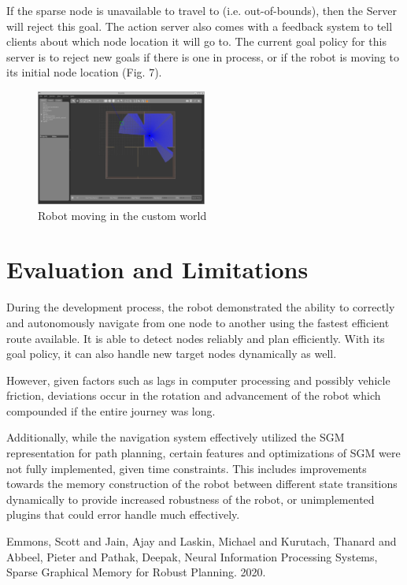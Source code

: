 \documentclass[conference]{IEEEtran}
\begin{document}
If the sparse node is unavailable to travel to (i.e. out-of-bounds), then the Server will reject this goal. The action server also comes with a feedback system to tell clients about which node location it will go to. The current goal policy for this server is to reject new goals if there is one in process, or if the robot is moving to its initial node location (Fig. 7).

\begin{figure}[h]
  \centering
  \includegraphics[width=0.5\textwidth]{../assets/map_nav_2.png}
  \caption{Robot moving in the custom world}
  \label{fig:example}
\end{figure}

\section{Evaluation and Limitations}
During the development process, the robot demonstrated the ability to correctly and autonomously navigate from one node to another using the fastest efficient route available. It is able to detect nodes reliably and plan efficiently. With its goal policy, it can also handle new target nodes dynamically as well.

However, given factors such as lags in computer processing and possibly vehicle friction, deviations occur in the rotation and advancement of the robot which compounded if the entire journey was long.

Additionally, while the navigation system effectively utilized the SGM representation for path planning, certain features and optimizations of SGM were not fully implemented, given time constraints. This includes improvements towards the memory construction of the robot between different state transitions dynamically to provide increased robustness of the robot, or unimplemented plugins that could error handle much effectively.

\begin{thebibliography}{00}
   Emmons, Scott and Jain, Ajay and   Laskin, Michael and Kurutach, Thanard   and Abbeel, Pieter and Pathak, Deepak, Neural Information Processing Systems, Sparse Graphical Memory for Robust Planning. 2020.

\end{thebibliography}
\end{document}
